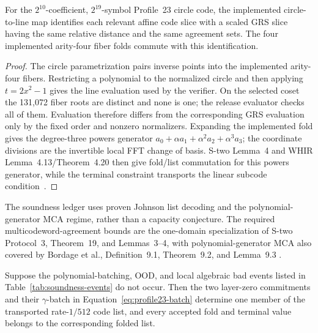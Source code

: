 \begin{lemma}
\label{lem:circle-grs-transport}
For the \(2^{10}\)-coefficient, \(2^{19}\)-symbol Profile~23 circle code,
the implemented circle-to-line map identifies each relevant affine code
slice with a scaled GRS slice having the same relative distance and the same
agreement sets.  The four implemented arity-four fiber folds commute with
this identification.
\end{lemma}

\begin{proof}
The circle parametrization pairs inverse points into the implemented
arity-four fibers.  Restricting a polynomial to the normalized circle and
then applying \(t=2x^2-1\) gives the line evaluation used by the verifier.
On the selected coset the 131,072 fiber roots are distinct and none is one;
the release evaluator checks all of them.  Evaluation therefore differs
from the corresponding GRS evaluation only by the fixed order and nonzero
normalizers.  Expanding the implemented fold gives the degree-three powers
generator \(a_0+\alpha a_1+\alpha^2a_2+\alpha^3a_3\); the coordinate
divisions are the invertible local FFT change of basis.  S-two Lemma~4 and
WHIR Lemma~4.13/Theorem~4.20 then give fold/list commutation for this powers
generator, while the terminal constraint transports the linear subcode
condition~\cite{CarmonEtAl2026Stwo,ArnonChiesaFenziYogev2025WHIR}.
\end{proof}

The soundness ledger uses proven Johnson list decoding and the
polynomial-generator MCA regime, rather than a capacity conjecture.  The
required multicodeword-agreement bounds are the one-domain specialization of
S-two Protocol~3, Theorem~19, and Lemmas~3--4, with polynomial-generator MCA
also covered by Bordage et al., Definition~9.1, Theorem~9.2, and Lemma~9.3
\cite{CarmonEtAl2026Stwo,BordageChiesaGuanManzur2025,Haboeck2025MCA}.

\begin{lemma}
\label{lem:johnson-mca-batch}
Suppose the polynomial-batching, OOD, and local algebraic bad events listed in
Table~\ref{tab:soundness-events} do not occur.  Then the two layer-zero
commitments and their \(\gamma\)-batch in
Equation~\eqref{eq:profile23-batch} determine one member of the transported
rate-\(1/512\) code list, and every accepted fold and terminal value belongs
to the corresponding folded list.
\end{lemma}

